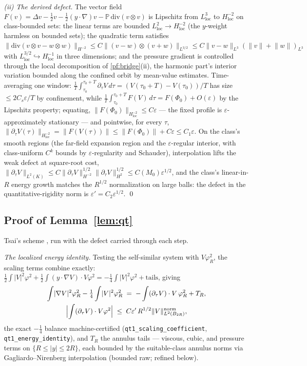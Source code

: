 \documentclass[11pt,letterpaper]{amsart}
\theoremstyle{definition}
\theoremstyle{remark}
\newcommand{\norm}[1]{\lVert #1 \rVert}
\newcommand{\abs}[1]{\lvert #1 \rvert}
\begin{document}
\emph{(ii) The derived defect.} The vector field
$F(v)=\Delta v-\tfrac12v-\tfrac12(y\cdot\nabla)v-\mathbb{P}\,\mathrm{div}(v\otimes v)$
is Lipschitz from $L^3_{\mathrm{loc}}$ to $H^{-2}_{\mathrm{loc}}$ on class-bounded
sets: the linear terms are bounded $L^2_{\mathrm{loc}}\to H^{-2}_{\mathrm{loc}}$
(the $y$-weight harmless on bounded sets); the quadratic term satisfies
$\norm{\mathrm{div}(v\otimes v-w\otimes w)}_{H^{-2}}\le
C\norm{(v-w)\otimes(v+w)}_{L^{3/2}}\le C\norm{v-w}_{L^3}(\norm{v}+\norm{w})_{L^3}$
with $L^{3/2}_{\mathrm{loc}}\hookrightarrow H^{-1}_{\mathrm{loc}}$ in three
dimensions; and the pressure gradient is controlled through the local decomposition
of \cref{pf:bridge}(ii), the harmonic part's interior variation bounded along the
confined orbit by mean-value estimates. Time-averaging one window:
$\tfrac1T\int_{\tau_0}^{\tau_0+T}\partial_\tau V\,d\tau=(V(\tau_0+T)-V(\tau_0))/T$
has size $\le2C_s\varepsilon/T$ by confinement, while
$\tfrac1T\int_{\tau_0}^{\tau_0+T}F(V)\,d\tau=F(\Phi_0)+O(\varepsilon)$ by the Lipschitz
property; equating, $\norm{F(\Phi_0)}_{H^{-2}_{\mathrm{loc}}}\le C\varepsilon$ ---
the fixed profile is $\varepsilon$-approximately stationary --- and pointwise, for
every $\tau$,
$\norm{\partial_\tau V(\tau)}_{H^{-2}_{\mathrm{loc}}}
=\norm{F(V(\tau))}\le\norm{F(\Phi_0)}+C\varepsilon\le C_1\varepsilon$. On the
class's smooth regions (the far-field expansion region and the
$\varepsilon$-regular interior, with class-uniform $C^k$ bounds by
$\varepsilon$-regularity and Schauder), interpolation lifts the weak defect at
square-root cost, $\norm{\partial_\tau V}_{L^2(K)}\le
C\norm{\partial_\tau V}_{H^{-2}}^{1/2}\norm{\partial_\tau V}_{H^{2}}^{1/2}\le
C(M_0)\varepsilon^{1/2}$, and the class's linear-in-$R$ energy growth matches the
$R^{1/2}$ normalization on large balls: the defect in the quantitative-rigidity norm
is $\varepsilon'=C_2\varepsilon^{1/2}$. \qed

\subsection{Proof of Lemma~\ref{lem:qt}}\label{pf:qt}
Tsai's scheme \cite{Tsai1998,NRS1996}, run with the defect carried through each step.

\emph{The localized energy identity.} Testing the self-similar system with
$V\varphi_R^2$, the scaling terms combine exactly:
$\tfrac12\int\abs{V}^2\varphi^2+\tfrac12\int(y\cdot\nabla V)\cdot V\varphi^2
=-\tfrac14\int\abs{V}^2\varphi^2+\text{tails}$, giving
\begin{multline*}
\int\abs{\nabla V}^2\varphi_R^2-\tfrac14\int\abs{V}^2\varphi_R^2
\;=\;-\int(\partial_\tau V)\cdot V\,\varphi_R^2+T_R,\\
\Bigl|\int(\partial_\tau V)\cdot V\varphi^2\Bigr|\;\le\;C\varepsilon'\,R^{1/2}
\norm{V}_{L^2(B_{2R})}^{\mathrm{norm}},
\end{multline*}
the exact $-\tfrac14$ balance machine-certified
(\texttt{qt1\_scaling\_coefficient}, \texttt{qt1\_energy\_identity}), and $T_R$ the
annulus tails --- viscous, cubic, and pressure terms on $\{R\le\abs{y}\le2R\}$, each
bounded by the suitable-class annulus norms via Gagliardo--Nirenberg interpolation
(bounded raw; refined below).
\end{document}
